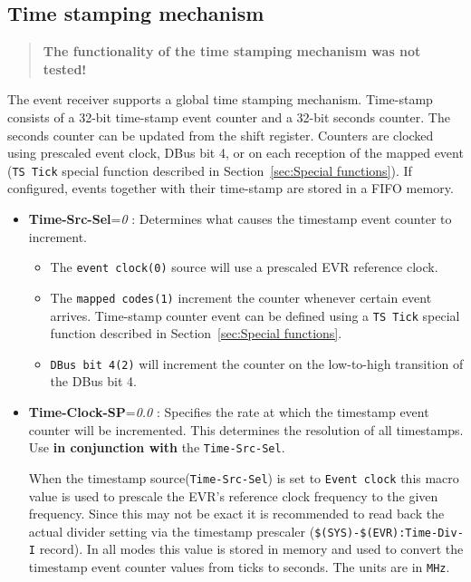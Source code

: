 \documentclass[12pt,a4paper]{article}
\begin{document}
\subsection{Time stamping mechanism}\label{sec:Time stamping mechanism}
\begin{quote}
\textbf{The functionality of the time stamping mechanism was not tested!}
\end{quote}
The event receiver supports a global time stamping mechanism. Time-stamp consists of a 32-bit time-stamp event counter and a 32-bit seconds counter. The seconds counter can be updated from the
shift register. Counters are clocked using prescaled event clock, DBus bit 4, or on each reception of the mapped event (\texttt{TS Tick} special function described in Section~\ref{sec:Special functions}). If configured, events together with their time-stamp are stored in a FIFO memory.

\begin{itemize}
\item
	\textbf{Time-Src-Sel}=\emph{0} : Determines what causes the
timestamp event counter to increment.

\begin{itemize}
\item
  The \texttt{event clock(0)} source will use a prescaled EVR
  reference clock.
\item
  The \texttt{mapped codes(1)} increment the counter whenever
  certain event arrives. Time-stamp counter event can be defined using a \texttt{TS Tick} special function described in Section~\ref{sec:Special functions}.
\item
  \texttt{DBus bit 4(2)} will increment the counter on the
  low-to-high transition of the DBus bit 4.
\end{itemize}
\item
	\textbf{Time-Clock-SP}=\emph{0.0} : Specifies the rate at which the
timestamp event counter will be incremented. This determines the
resolution of all timestamps. Use \textbf{in conjunction with} the \texttt{Time-Src-Sel}.

When the timestamp source(\texttt{Time-Src-Sel}) is set to \texttt{Event clock}
this macro value is used to prescale the EVR's reference clock
frequency to the given frequency. Since this may not be exact it is
recommended to read back the actual divider setting via the
timestamp prescaler (\texttt{\$(SYS)-\$(EVR):Time-Div-I} record). In
all modes this value is stored in memory and used to convert the
timestamp event counter values from ticks to seconds. The units are
in \texttt{MHz}.
\end{itemize}
\end{document}
